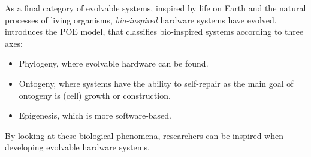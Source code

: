 
As a final category of evolvable systems, inspired by life on Earth and the natural processes of living organisms, \emph{bio-inspired} hardware systems have evolved. \cite{poe} introduces the POE model, that classifies bio-inspired systems according to three axes:
\begin{itemize}
	\item Phylogeny, where evolvable hardware can be found.
	\item Ontogeny, where systems have the ability to self-repair as the main goal of ontogeny is (cell) growth or construction.
	\item Epigenesis, which is more software-based.
\end{itemize}

By looking at these biological phenomena, researchers can be inspired when developing evolvable hardware systems.